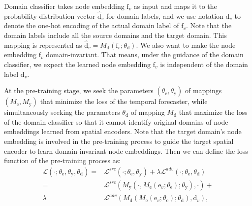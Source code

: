 \documentclass[sigconf]{acmart}
\theoremstyle{definition}
\begin{document}
Domain classifier takes node embedding $\mathrm{f}_v$ as input and maps it to the probability distribution vector $\widehat{\mathrm{d}}_v$ for domain labels, and we use notation $\mathrm{d}_v$ to denote the one-hot encoding of the actual domain label of $\mathrm{f}_v$. Note that the domain labels include all the source domains and the target domain. This mapping is represented as $\widehat{\mathrm{d}}_v={M}_\mathrm{d}\left(\mathrm{f}_v ; \theta_\mathrm{d}\right)$. We also want to make the node embedding $\mathrm{f}_v$ domain-invariant. That means, under the guidance of the domain classifier, we expect the learned node embedding $\mathrm{f}_v$ is independent of the domain label $\mathrm{d}_v$.














At the pre-training stage, we seek the parameters $(\theta_{\mathrm{e}}, \theta_{\mathrm{y}})$ of mappings $(M_\mathrm{e}, M_\mathrm{y})$ that minimize the loss of the temporal forecaster, while simultaneously seeking the parameters $\theta_{\mathrm{d}}$ of mapping $M_{\mathrm{d}}$ that maximize the loss of the domain classifier so that it cannot identify original domains of node embeddings learned from spatial encoders. 
Note that the target domain's node embedding is involved in the pre-training process to guide the target spatial encoder to learn domain-invariant node embeddings. Then we can define the loss function of the pre-training process as:
\begin{equation}\label{eq3}
    \begin{aligned}
\mathcal{L}(\cdot;\theta_{\mathrm{e}},\theta_{\mathrm{y}},\theta_{\mathrm{d}})=&\mathcal{L}^{src}\left(\cdot;\theta_{\mathrm{e}},\theta_{\mathrm{y}}\right)+\lambda\mathcal{L}^{adv}\left(\cdot;\theta_{\mathrm{e}},\theta_{\mathrm{d}}\right)\\
=&\mathcal{L}^{src}\left(M_{\mathrm{y}}\left(\cdot,M_{\mathrm{e}}\left(\mathrm{e}_v;\theta_{\mathrm{e}}\right);\theta_{\mathrm{y}}\right),\cdot\right) + \\ \lambda&\mathcal{L}^{adv}\left(M_{\mathrm{d}}\left(M_{\mathrm{e}}\left(\mathrm{e}_v;\theta_\mathrm{e}\right);\theta_\mathrm{d}\right),\mathrm{d}_v\right),
    \end{aligned}
\end{equation}
\end{document}
